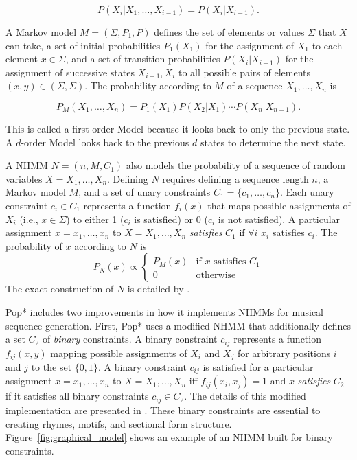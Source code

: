 \documentclass[phd,electronic,oneside,twosidetoc,letterpaper,chaptercenter,parttop,lol,lof,lot]{byumsphd}
\begin{document}
\[
P(X_i|X_1,\dots, X_{i-1}) = P(X_i|X_{i-1}).
\]

\noindent A Markov model $M = (\Sigma, P_1, P)$ defines the set of elements or values $\Sigma$ that $X$ can take, a set of initial probabilities $P_1(X_1)$ for the assignment of $X_1$ to each element $x \in \Sigma$, and a set of transition probabilities $P(X_i|X_{i-1})$ for the assignment of successive states $X_{i-1},X_i$ to all possible pairs of elements $(x,y)\in (\Sigma,\Sigma)$. The probability according to $M$ of a sequence $X_1,\dots,X_n$ is

\[
P_M(X_1,\dots,X_n) = P_1(X_1)P(X_2|X_1)\cdots P(X_n|X_{n-1}).
\]

This is called a first-order Model because it looks back to only the previous state. A $d$-order Model looks back to the previous $d$ states to determine the next state.

A NHMM $N = (n, M, C_1)$ also models the probability of a sequence of random variables $X=X_1,\dots,X_n$. Defining $N$ requires defining a sequence length $n$, a Markov model $M$, and a set of unary constraints $C_1=\{c_1,\dots,c_n\}$. Each unary constraint $c_i\in C_1$ represents a function $f_i(x)$ that maps possible assignments of $X_i$ (i.e., $x\in\Sigma$) to either 1 ($c_i$ is satisfied) or 0 ($c_i$ is not satisfied). A particular assignment $x=x_1,\dots,x_n$ to $X=X_1,\dots,X_n$ \textit{satisfies} $C_1$ if $\forall i$ $x_i$ satisfies $c_i$. The probability of $x$ according to $N$ is
\[
P_{N}(x) \propto 
\begin{cases}
P_M(x) & \text{if } x \text{ satisfies } {C_1} \\
0 & \text{otherwise}
\end{cases}
\]
\noindent The exact construction of $N$ is detailed by \cite{pachet2011finite-lengthConstraints}. 

Pop* includes two improvements in how it implements NHMMs for musical sequence generation. First, Pop* uses a modified NHMM that additionally defines a set ${C_2}$ of \textit{binary} constraints. A binary constraint $c_{ij}$ represents a function $f_{ij}(x,y)$ mapping possible assignments of $X_i$ and $X_j$ for arbitrary positions $i$ and $j$ to the set $\{0,1\}$. A binary constraint $c_{ij}$ is satisfied for a particular assignment $x=x_1,\dots,x_n$ to $X=X_1,\dots,X_n$ iff $f_{ij}(x_i,x_j)=1$ and $x$ \textit{satisfies} $C_2$ if it satisfies all binary constraints $c_{ij} \in C_2$. The details of this modified implementation are presented in \cite{bodily2018relational}. These binary constraints are essential to creating rhymes, motifs, and sectional form structure. Figure~\ref{fig:graphical_model} shows an example of an NHMM built for binary constraints.
\end{document}
